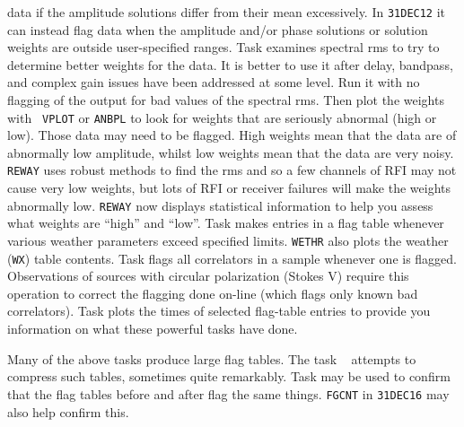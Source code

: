     data if the amplitude solutions differ from their mean
    excessively.  In {\tt 31DEC12} it can instead flag data when the
    amplitude and/or phase solutions or solution weights are outside
    user-specified ranges.
\Item Task {\tt {}} examines spectral rms to try to
    determine better weights for the data.  It is better to use it
    after delay, bandpass, and complex gain issues have been addressed
    at some level.  Run it with no flagging of the output for bad
    values of the spectral rms.  Then plot the weights with {\tt
    VPLOT} or {\tt ANBPL} to look for weights that are seriously
    abnormal (high or low).  Those data may need to be flagged.  High
    weights mean that the data are of abnormally low amplitude, whilst
    low weights mean that the data are very noisy.  {\tt REWAY} uses
    robust methods to find the rms and so a few channels of RFI may
    not cause very low weights, but lots of RFI or receiver failures
    will make the weights abnormally low.  {\tt REWAY} now displays
    statistical information to help you assess what weights are
    ``high'' and ``low''.
\Item Task {\tt {}} makes entries in a flag table whenever
    various weather parameters exceed specified limits.  {\tt WETHR}
    also plots the weather ({\tt WX}) table contents.
\Item Task {\tt {}} flags all correlators in a sample
    whenever one is flagged.  Observations of sources with circular
    polarization (Stokes V) require this operation to correct the
    flagging done on-line (which flags only known bad correlators).
\Item Task {\tt {}} plots the times of selected flag-table
    entries to provide you information on what these powerful tasks
    have done.
\xeit

Many of the above tasks produce large flag tables.  The task {\tt
{}} attempts to compress such tables, sometimes quite
remarkably.  Task {\tt {}} may be used to confirm that the
flag tables before and after flag the same things.  {\tt FGCNT} in
{\tt 31DEC16} may also help confirm this.


